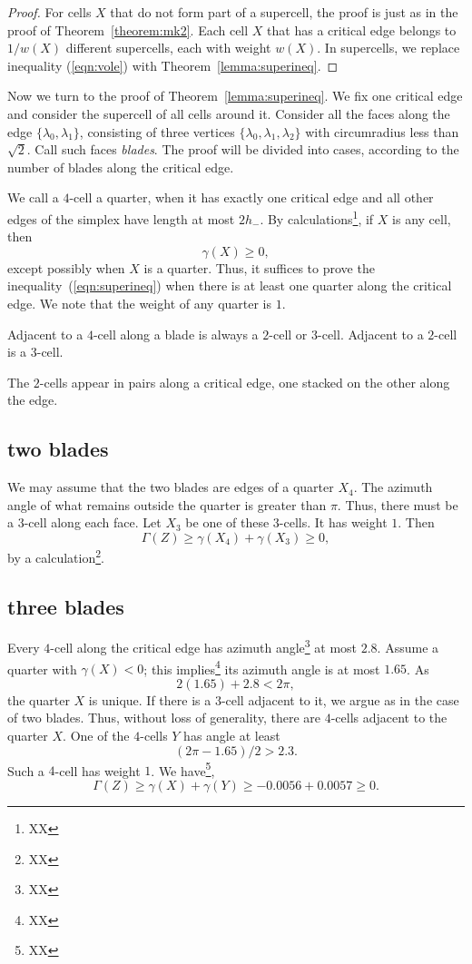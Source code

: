 \begin{proof}  For cells $X$ that do not form part of a supercell,
the proof is just as in the proof of Theorem~\ref{theorem:mk2}.
Each cell $X$ that has a critical edge belongs to $1/w(X)$ different
supercells, each with weight $w(X)$.  In supercells, we replace inequality
(\ref{eqn:vole}) with Theorem~\ref{lemma:superineq}.
\end{proof}

Now we turn to the proof of Theorem~\ref{lemma:superineq}.
We fix one critical edge and consider the supercell of all cells around it.  Consider all the faces along the edge $\{\lambda_0,\lambda_1\}$, consisting of three vertices $\{\lambda_0,\lambda_1,\lambda_2\}$ with circumradius less than $\sqrt2$.  Call such faces {\it blades}.  The proof will be divided into cases, according to the number of blades along the critical edge.

We call a $4$-cell a quarter, when it has exactly one
critical edge and all other edges of the simplex have length
at most $2 h_-$.
By calculations\footnote{XX}, if $X$ is any cell, then
$$
 \gamma(X) \ge 0,
$$ 
except possibly when $X$ is a quarter.  Thus, it
suffices to prove the inequality~(\ref{eqn:superineq})
when there is at least one quarter along the critical
edge.  We note that the weight of any quarter is $1$.

Adjacent to a $4$-cell along a blade is always a $2$-cell or $3$-cell.
Adjacent to a $2$-cell is a $3$-cell.

The $2$-cells appear in pairs along a critical edge,
one stacked on the other along the edge.

\subsection{two blades}

We may assume that the two blades are edges of a quarter
$X_4$. 
The azimuth angle of what remains outside the quarter
is greater than $\pi$.  Thus, there must be a $3$-cell
along each face.  Let $X_3$ be one of these $3$-cells.
It has weight $1$.
Then $$\Gamma(Z)\ge \gamma(X_4)+\gamma(X_3)\ge 0,$$
by a calculation\footnote{XX}.

\subsection{three blades}

Every $4$-cell along the critical edge has azimuth
angle\footnote{XX} at most $2.8$.  Assume a quarter with $\gamma(X) <0$;
this implies\footnote{XX} 
its azimuth angle is at most $1.65$.
As
$$
2 (1.65) + 2.8 < 2 \pi,
$$
the quarter $X$ is unique.  If there is a $3$-cell adjacent
to it, we argue as in the case of two blades.  Thus, without loss of generality, there are $4$-cells adjacent to the quarter $X$.  One of the $4$-cells $Y$ has angle at least
$$
(2\pi - 1.65)/2 > 2.3.
$$
Such a $4$-cell has weight $1$.
We have\footnote{XX},
$$
\Gamma(Z)\ge \gamma(X) + \gamma(Y) \ge -0.0056 + 0.0057 \ge0.
$$

